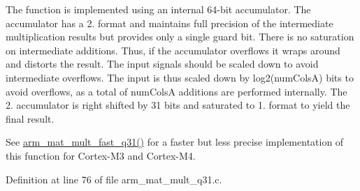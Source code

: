 \begin{DoxyParagraph}{}
The function is implemented using an internal 64-\/bit accumulator. The accumulator has a 2. format and maintains full precision of the intermediate multiplication results but provides only a single guard bit. There is no saturation on intermediate additions. Thus, if the accumulator overflows it wraps around and distorts the result. The input signals should be scaled down to avoid intermediate overflows. The input is thus scaled down by log2(num\-Cols\-A) bits to avoid overflows, as a total of num\-Cols\-A additions are performed internally. The 2. accumulator is right shifted by 31 bits and saturated to 1. format to yield the final result.
\end{DoxyParagraph}
\begin{DoxyParagraph}{}
See {\ttfamily \hyperlink{group___matrix_mult_ga2785e8c1b785348b0c439b56aaf585a3}{arm\-\_\-mat\-\_\-mult\-\_\-fast\-\_\-q31()}} for a faster but less precise implementation of this function for Cortex-\/\-M3 and Cortex-\/\-M4. 
\end{DoxyParagraph}


Definition at line 76 of file arm\-\_\-mat\-\_\-mult\-\_\-q31.\-c.

